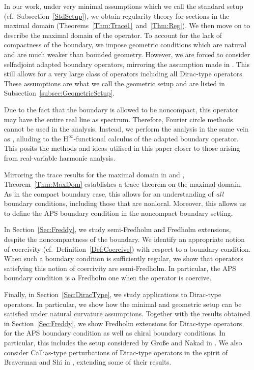 \documentclass[a4paper,10pt,reqno]{amsart}
\newcommand{\Hinfty}{$\mathrm{H}^\infty$}
\theoremstyle{definition}
\begin{document}
In our work, under very minimal assumptions which we call the standard setup (cf.\ Subsection~\ref{StdSetup}), we obtain regularity theory for sections in the maximal domain (Theorems~\ref{Thm:Trace1}~and~\ref{Thm:Reg}).
We then move on to describe the maximal domain of the operator.
To account for the lack of compactness of the boundary, we impose geometric conditions which are natural and are much weaker than bounded geometry.
However, we are forced to consider selfadjoint adapted boundary operators, mirroring the assumption made in \cite{BB12}.
This still allows for a very large class of operators including all Dirac-type operators.
These assumptions are what we call the geometric setup and are listed in Subsection~\ref{subsec:GeometricSetup}.

Due to the fact that the boundary is allowed to be noncompact, this operator may have the entire real line as spectrum.
Therefore, Fourier circle methods cannot be used in the analysis.
Instead, we perform the analysis in the same vein as \cite{BBan}, alluding to the \Hinfty-functional calculus of the adapted boundary operator.
This posits the methods and ideas utilised in this paper closer to those arising from real-variable harmonic analysis.


Mirroring the trace results for the maximal domain in \cite{BB12} and \cite{BBan}, Theorem~\ref{Thm:MaxDom} establishes a trace theorem on the maximal domain.
As in the compact boundary case, this allows for an understanding of \emph{all} boundary conditions, including those that are nonlocal.
Moreover, this allows us to define the APS boundary condition in the noncompact boundary setting.

In Section~\ref{Sec:Freddy}, we study  semi-Fredholm and Fredholm extensions, despite the noncompactness of the boundary.
We identify an appropriate  notion of coercivity  (cf.\ Definition~\ref{Def:Coercive}) with respect to a boundary condition.
When such a boundary condition is sufficiently regular, we show that operators satisfying this notion of coercivity are semi-Fredholm.
In particular, the APS boundary condition is a Fredholm one when the operator is coercive.

Finally, in Section~\ref{Sec:DiracType}, we study applications to Dirac-type operators.
In particular, we show how the minimal and geometric setup can be satisfied under natural curvature assumptions. 
Together with the results obtained in Section~\ref{Sec:Freddy}, we show Fredholm extensions for Dirac-type operators for the APS boundary condition as well as chiral boundary conditions.
In particular, this includes the setup considered by Große and Nakad in \cite{GN}.
We also consider Callias-type perturbations of Dirac-type operators in the spirit of Braverman and Shi in \cites{BS0, BS1, BS2}, extending some of their results.
\end{document}
